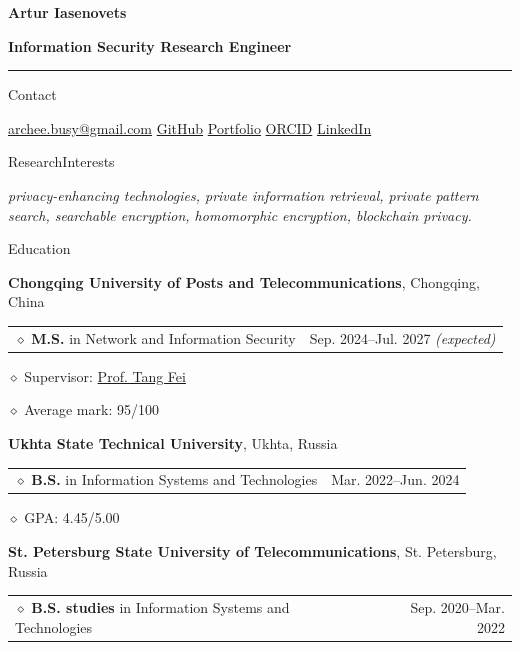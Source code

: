 \documentclass[11pt,a4paper]{article}
\makeatletter
\newcommand{\cvrow}[2]{%
  \noindent
  \begin{minipage}[t]{0.145\textwidth}
    \vspace{0pt}%
    \raggedright
    \fontsize{10.5}{12.5}\selectfont
    #1
  \end{minipage}%
  \hfill
  \begin{minipage}[t]{0.835\textwidth}
    \vspace{0pt}%
    #2
  \end{minipage}\par
}
\newcommand{\eduentry}[2]{%
  \noindent
  \begin{tabularx}{\linewidth}
    {@{}X@{\hspace{0.8em}}r@{}}
    #1 & \small #2
  \end{tabularx}\par
  \vspace{0.15em}
}
\newcommand{\edudetail}[1]{%
  \noindent\hspace*{1.15em}$\diamond$ #1\par
}
\makeatother
\begin{document}
{\fontsize{24}{28}\selectfont\bfseries Artur Iasenovets}\par
\vspace{0.08em}
{\large\bfseries Information Security Research Engineer}\par
\vspace{0.22em}
\hrule
\vspace{0.55em}

\cvrow{Contact}{%
  \href{mailto:archee.busy@gmail.com}{archee.busy@gmail.com}
  \;\textbullet\;
  \href{https://github.com/iasenovets}{GitHub}
  \;\textbullet\;
  \href{https://iasenovets.github.io/}{Portfolio}
  \;\textbullet\;
  \href{https://orcid.org/0009-0008-0008-3746}{ORCID}
  \;\textbullet\;
  \href{https://linkedin.com/in/iasenovets}{LinkedIn}
}

\vspace{0.55em}

\cvrow{Research\newline Interests}{%
  \textit{privacy-enhancing technologies, private information retrieval, private pattern search,
  searchable encryption, homomorphic encryption, blockchain privacy.}
}

\vspace{0.75em}

\cvrow{Education}{%
  \raggedright

  \textbf{Chongqing University of Posts and Telecommunications},
  Chongqing, China\par
  \vspace{0.12em}

  \eduentry
    {$\diamond$ \textbf{M.S.} in Network and Information Security}
    {Sep. 2024--Jul. 2027 \textit{(expected)}}

  \edudetail{Supervisor:
    \href{https://faculty.cqupt.edu.cn/tangfei/en/index.htm}{Prof. Tang Fei}}
  \edudetail{Average mark: 95/100}

  \vspace{0.48em}

  \textbf{Ukhta State Technical University},
  Ukhta, Russia\par
  \vspace{0.12em}

  \eduentry
    {$\diamond$ \textbf{B.S.} in Information Systems and Technologies}
    {Mar. 2022--Jun. 2024}

  \edudetail{GPA: 4.45/5.00}

  \vspace{0.48em}

  \textbf{St. Petersburg State University of Telecommunications},
  St. Petersburg, Russia\par
  \vspace{0.12em}

  \eduentry
    {$\diamond$ \textbf{B.S. studies} in Information Systems and Technologies}
    {Sep. 2020--Mar. 2022}
}
\end{document}
